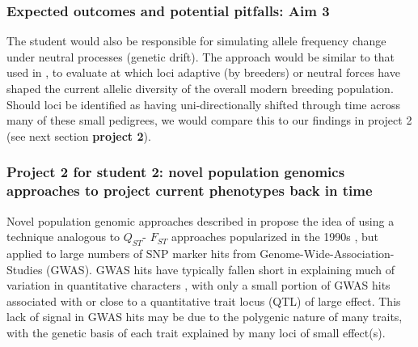 \documentclass[draft,12pt]{article}
\newcommand{\jri}[1]{\textcolor{blue}{ \emph{\scriptsize  #1}} }
\begin{document}
\subsubsection*{Expected outcomes and potential pitfalls: Aim 3}



The student would also be responsible for simulating allele frequency change under neutral processes (genetic drift). The approach would be similar to that used in \citep{Gerke:2013tw}, to evaluate at which loci adaptive (by breeders) or neutral forces have shaped the current allelic diversity of the overall modern breeding population. 
Should loci be identified as having uni-directionally shifted through time across many of these small pedigrees, we would compare this to our findings in project 2 (see next section \textbf{project 2}).








\subsubsection*{Project 2 for student 2: novel population genomics approaches to project current phenotypes back in time}
Novel population genomic approaches described in \cite{Berg:2014bs} propose the idea of using a technique analogous to $Q_{ST}$- $F_{ST}$ approaches popularized in the 1990s \citep{Latta:1998ek,  McKay:2002wi}, but applied to large numbers of SNP marker hits from Genome-Wide-Association-Studies (GWAS). 
GWAS hits have typically fallen short in explaining much of variation in quantitative characters \citep{Rockman:2011ej}, with only a small portion of GWAS hits associated with or close to a quantitative trait locus (QTL) of large effect. 
This lack of signal in GWAS hits may be due to the polygenic nature of many traits, with the genetic basis of each trait explained by many loci of small effect(s). 
\end{document}
